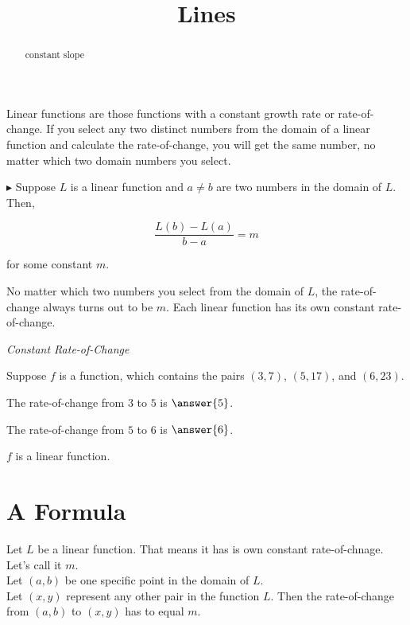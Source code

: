 \documentclass{ximera}
\title{Lines}
\begin{document}
\begin{abstract}
constant slope
\end{abstract}
\maketitle


Linear functions are those functions with a constant growth rate or rate-of-change.  If you select any two distinct numbers from the domain of a linear function and calculate the rate-of-change, you will get the same number, no matter which two domain numbers you select.

$\blacktriangleright$ Suppose $L$ is a linear function and $a \ne b$ are two numbers in the domain of $L$. Then, 

\[    \frac{L(b) - L(a)}{b - a} = m   \]

for some constant $m$.


No matter which two numbers you select from the domain of $L$, the rate-of-change always turns out to be $m$.  Each linear function has its own constant rate-of-change.




\begin{example} \textit{Constant Rate-of-Change}


Suppose $f$ is a function, which contains the pairs $(3, 7)$, $(5, 17)$, and $(6, 23)$.


The rate-of-change from $3$ to $5$ is $\answer{5}$.

The rate-of-change from $5$ to $6$ is $\answer{6}$.

$f$ is a linear function.
\begin{multipleChoice}
\end{multipleChoice}


\end{example}



\section{A Formula}

Let $L$ be a linear function.  That means it has is own constant rate-of-chnage.  Let's call it $m$. \\

Let $(a, b)$ be one specific point in the domain of $L$.\\


Let $(x, y)$ represent any other pair in the function $L$. Then the rate-of-change from $(a,b)$ to $(x, y)$ has to equal $m$.
\end{document}
